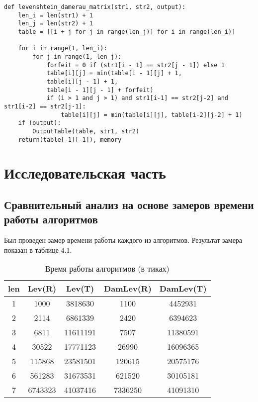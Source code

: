 \documentclass[12pt]{report}
\begin{document}
\begin{lstlisting}[label=some-code,caption=Функция нахождения расстояния Дамерау-Левенштейна матрично]
def levenshtein_damerau_matrix(str1, str2, output):
	len_i = len(str1) + 1
	len_j = len(str2) + 1
	table = [[i + j for j in range(len_j)] for i in range(len_i)]

	for i in range(1, len_i):
		for j in range(1, len_j):
			forfeit = 0 if (str1[i - 1] == str2[j - 1]) else 1
			table[i][j] = min(table[i - 1][j] + 1,
			table[i][j - 1] + 1,
			table[i - 1][j - 1] + forfeit)
			if (i > 1 and j > 1) and str1[i-1] == str2[j-2] and str1[i-2] == str2[j-1]:
				table[i][j] = min(table[i][j], table[i-2][j-2] + 1)
	if (output):        
		OutputTable(table, str1, str2)
	return(table[-1][-1]), memory
\end{lstlisting}


\chapter{Исследовательская часть}

\section{Сравнительный анализ на основе замеров времени работы алгоритмов}

Был проведен замер времени работы каждого из алгоритмов. Результат замера показан в таблице 4.1.


\begin{table} [ht]
	\caption{Время работы алгоритмов (в тиках)}
\begin{tabular}{|c c c c c|} 
 	\hline
	len & Lev(R) & Lev(T) & DamLev(R) & DamLev(T) \\ [0.8ex] 
 	\hline\hline
 	1 & 1000 & 3818630 & 1100 & 4452931\\
 	\hline
 	2 & 2114 & 6861339 & 2420 & 6394623\\
 	\hline
	3 & 6811 & 11611191 & 7507 & 11380591\\
	\hline
	4 & 30522 & 17771123 & 26990 & 16096365\\
	\hline
	5 & 115868 & 23581501 & 120615 & 20575176\\
	\hline
	6 & 561283 & 31673531 & 621520 & 30105181\\
	\hline
	7 & 6743323 & 41037416 & 7336250 & 41091310\\
	\hline
	\end{tabular}
\end{table}
\end{document}
